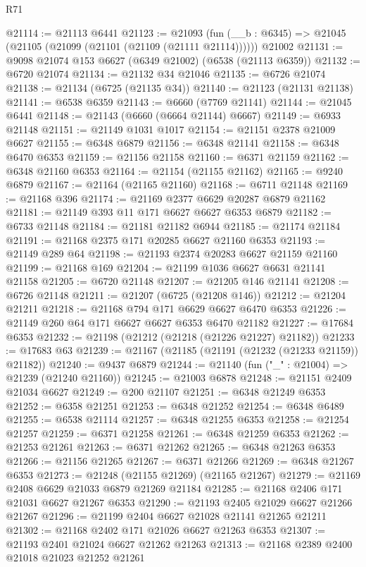 \begin{lexlean}{R71}
\begin{coremodule}
@21114 := @21113 @6441
@21123 := @21093
    (fun (__b : @6345) => @21045 (@21105 (@21099 (@21101 (@21109 (@21111 @21114))))))
    @21002
@21131 := @9098 @21074 @153 @6627 (@6349 @21002) (@6538 (@21113 @6359))
@21132 := @6720 @21074
@21134 := @21132 @34 @21046
@21135 := @6726 @21074
@21138 := @21134 (@6725 (@21135 @34))
@21140 := @21123 (@21131 @21138)
@21141 := @6538 @6359
@21143 := @6660 (@7769 @21141)
@21144 := @21045 @6441
@21148 := @21143 (@6660 (@6664 @21144) @6667)
@21149 := @6933 @21148
@21151 := @21149 @1031 @1017
@21154 := @21151 @2378 @21009 @6627
@21155 := @6348 @6879
@21156 := @6348 @21141
@21158 := @6348 @6470 @6353
@21159 := @21156 @21158
@21160 := @6371 @21159
@21162 := @6348 @21160 @6353
@21164 := @21154 (@21155 @21162)
@21165 := @9240 @6879
@21167 := @21164 (@21165 @21160)
@21168 := @6711 @21148
@21169 := @21168 @396
@21174 := @21169 @2377 @6629 @20287 @6879 @21162
@21181 := @21149 @393 @11 @171 @6627 @6627 @6353 @6879
@21182 := @6733 @21148
@21184 := @21181 @21182 @6944
@21185 := @21174 @21184
@21191 := @21168 @2375 @171 @20285 @6627 @21160 @6353
@21193 := @21149 @289 @64
@21198 := @21193 @2374 @20283 @6627 @21159 @21160
@21199 := @21168 @169
@21204 := @21199 @1036 @6627 @6631 @21141 @21158
@21205 := @6720 @21148
@21207 := @21205 @146 @21141
@21208 := @6726 @21148
@21211 := @21207 (@6725 (@21208 @146))
@21212 := @21204 @21211
@21218 := @21168 @794 @171 @6629 @6627 @6470 @6353
@21226 := @21149 @260 @64 @171 @6627 @6627 @6353 @6470 @21182
@21227 := @17684 @6353
@21232 := @21198 (@21212 (@21218 (@21226 @21227) @21182))
@21233 := @17683 @63
@21239 := @21167 (@21185 (@21191 (@21232 (@21233 @21159)) @21182))
@21240 := @9437 @6879
@21244 := @21140 (fun ("_" : @21004) => @21239 (@21240 @21160))
@21245 := @21003 @6878
@21248 := @21151 @2409 @21034 @6627
@21249 := @200 @21107
@21251 := @6348 @21249 @6353
@21252 := @6358 @21251
@21253 := @6348 @21252
@21254 := @6348 @6489
@21255 := @6538 @21114
@21257 := @6348 @21255 @6353
@21258 := @21254 @21257
@21259 := @6371 @21258
@21261 := @6348 @21259 @6353
@21262 := @21253 @21261
@21263 := @6371 @21262
@21265 := @6348 @21263 @6353
@21266 := @21156 @21265
@21267 := @6371 @21266
@21269 := @6348 @21267 @6353
@21273 := @21248 (@21155 @21269) (@21165 @21267)
@21279 := @21169 @2408 @6629 @21033 @6879 @21269 @21184
@21285 := @21168 @2406 @171 @21031 @6627 @21267 @6353
@21290 := @21193 @2405 @21029 @6627 @21266 @21267
@21296 := @21199 @2404 @6627 @21028 @21141 @21265 @21211
@21302 := @21168 @2402 @171 @21026 @6627 @21263 @6353
@21307 := @21193 @2401 @21024 @6627 @21262 @21263
@21313 := @21168 @2389 @2400 @21018 @21023 @21252 @21261

\end{coremodule}
\end{lexlean}
